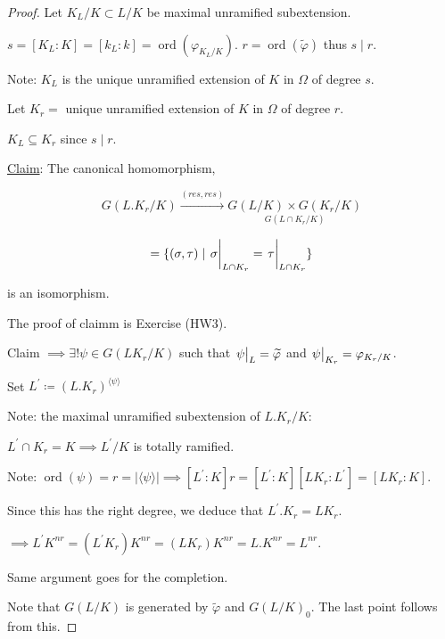 \documentclass{article}
\theoremstyle{definition}
\numberwithin{theorem}{subsection}
\begin{document}
    \begin{proof}
        Let \(K_L / K \subset L / K\) be maximal unramified subextension.

        \begin{center}
        \end{center}

        \(s = [K_L : K] = [k_L : k] = \operatorname{ord} (\varphi_{K_L / K})\). \(r = \operatorname{ord} (\widetilde{\varphi})\) thus \(s\mid r\).
        
        Note: \(K_L\) is the unique unramified extension of \(K\) in \(\Omega\) of degree \(s\).

        Let \(K_r =\) unique unramified extension of \(K\) in \(\Omega\) of degree \(r\).

        \(K_L \subseteq K_r\) since \(s\mid r\).

        \underline{Claim}: The canonical homomorphism,

        \[
            G(L . K_r / K) \xrightarrow{(res,res)} \underset{G(L\cap K_r / K)}{G(L / K) \times G(K_r / K)}
        \]

        \[
            = \{ (\sigma,\tau) \mid \eval{\sigma}_{L\cap K_r} = \eval{\tau}_{L \cap K_r} \} 
        \]

        is an isomorphism.

        The proof of claimm is Exercise (HW3).

        Claim \(\implies \exists ! \psi \in G(LK_r / K)\) such that \(\eval{\psi}_L = \widetilde{\varphi}\) and \(\eval{\psi}_{K_r} = \varphi_{K_r / K}\).

        Set \(L^{\prime} \coloneqq (L . K_r)^{\langle \psi \rangle}\) 

        Note: the maximal unramified subextension of \(L . K_r / K\):

        \(L^{\prime} \cap K_r = K \implies L^{\prime} / K\) is totally ramified.

        Note: \(\operatorname{ord} (\psi) = r = \vert \langle \psi \rangle \vert  \implies [L^{\prime} : K] r = [L^{\prime} : K] [LK_r : L^{\prime}] = [LK_r : K]\).
        
        Since this has the right degree, we deduce that \(L^{\prime} . K_r = LK_r\).

        \(\implies L^{\prime} K^{nr} = (L^{\prime} K_r) K^{nr} = (LK_r)K^{nr} = L . K^{nr} = L^{nr}\).

        Same argument goes for the completion.

        Note that \(G(L / K)\) is generated by \(\widetilde{\varphi}\) and \(G(L / K)_0\). The last point follows from this.
    \end{proof}
\end{document}
